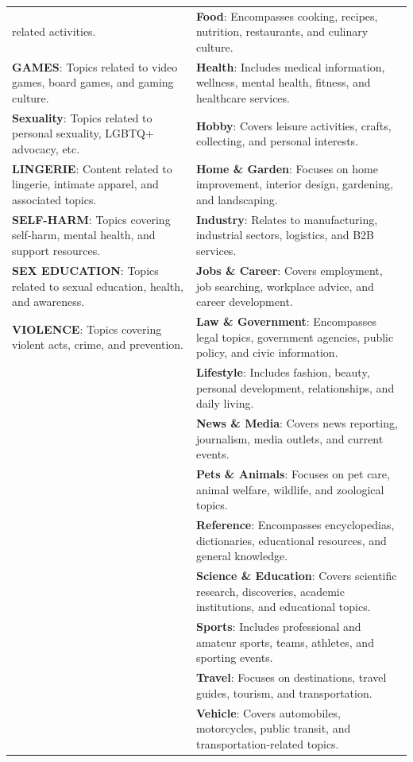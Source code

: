 \documentclass[
  titlepage]{article}
\begin{document}
\begin{longtable}[]{@{}
  >{\raggedright\arraybackslash}p{}
  >{\raggedright\arraybackslash}p{}@{}}
related activities. & \textbf{Food}: Encompasses cooking, recipes,
nutrition, restaurants, and culinary culture. \\
\textbf{GAMES}: Topics related to video games, board games, and gaming
culture. & \textbf{Health}: Includes medical information, wellness,
mental health, fitness, and healthcare services. \\
\textbf{Sexuality}: Topics related to personal sexuality, LGBTQ+
advocacy, etc. & \textbf{Hobby}: Covers leisure activities, crafts,
collecting, and personal interests. \\
\textbf{LINGERIE}: Content related to lingerie, intimate apparel, and
associated topics. & \textbf{Home \& Garden}: Focuses on home
improvement, interior design, gardening, and landscaping. \\
\textbf{SELF-HARM}: Topics covering self-harm, mental health, and
support resources. & \textbf{Industry}: Relates to manufacturing,
industrial sectors, logistics, and B2B services. \\
\textbf{SEX EDUCATION}: Topics related to sexual education, health, and
awareness. & \textbf{Jobs \& Career}: Covers employment, job searching,
workplace advice, and career development. \\
\textbf{VIOLENCE}: Topics covering violent acts, crime, and prevention.
& \textbf{Law \& Government}: Encompasses legal topics, government
agencies, public policy, and civic information. \\
& \textbf{Lifestyle}: Includes fashion, beauty, personal development,
relationships, and daily living. \\
& \textbf{News \& Media}: Covers news reporting, journalism, media
outlets, and current events. \\
& \textbf{Pets \& Animals}: Focuses on pet care, animal welfare,
wildlife, and zoological topics. \\
& \textbf{Reference}: Encompasses encyclopedias, dictionaries,
educational resources, and general knowledge. \\
& \textbf{Science \& Education}: Covers scientific research,
discoveries, academic institutions, and educational topics. \\
& \textbf{Sports}: Includes professional and amateur sports, teams,
athletes, and sporting events. \\
& \textbf{Travel}: Focuses on destinations, travel guides, tourism, and
transportation. \\
& \textbf{Vehicle}: Covers automobiles, motorcycles, public transit, and
transportation-related topics. \\
\end{longtable}
\end{document}
